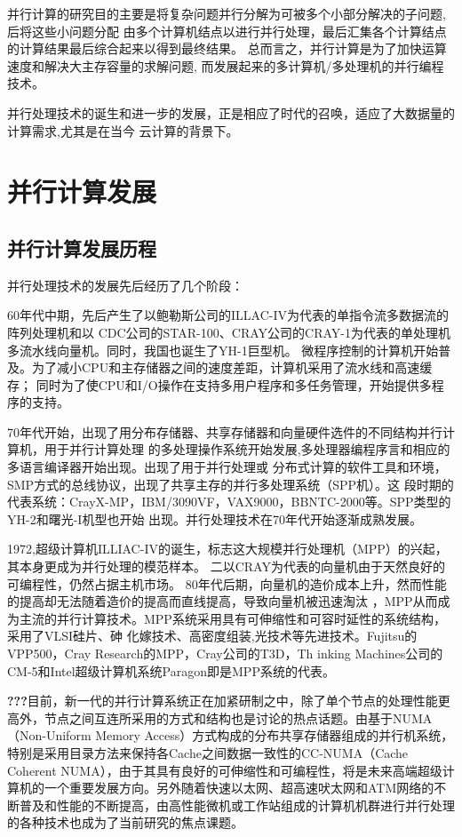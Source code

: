     
并行计算的研究目的主要是将复杂问题并行分解为可被多个小部分解决的子问题,后将这些小问题分配
由多个计算机结点以进行并行处理，最后汇集各个计算结点的计算结果最后综合起来以得到最终结果。
总而言之，并行计算是为了加快运算速度和解决大主存容量的求解问题,
而发展起来的多计算机/多处理机的并行编程技术。

并行处理技术的诞生和进一步的发展，正是相应了时代的召唤，适应了大数据量的计算需求,尤其是在当今
云计算的背景下。

\section{并行计算发展}
\subsection{并行计算发展历程}
并行处理技术的发展先后经历了几个阶段：

60年代中期，先后产生了以鲍勒斯公司的ILLAC-IV为代表的单指令流多数据流的阵列处理机和以
CDC公司的STAR-100、CRAY公司的CRAY-1为代表的单处理机多流水线向量机。同时，我国也诞生了YH-1巨型机。
微程序控制的计算机开始普及。为了减小CPU和主存储器之间的速度差距，计算机采用了流水线和高速缓存；
同时为了使CPU和I/O操作在支持多用户程序和多任务管理，开始提供多程序的支持。

70年代开始，出现了用分布存储器、共享存储器和向量硬件选件的不同结构并行计算机，用于并行计算处理
的多处理操作系统开始发展,多处理器编程序言和相应的多语言编译器开始出现。出现了用于并行处理或
分布式计算的软件工具和环境，SMP方式的总线协议，出现了共享主存的并行多处理系统（SPP机）。这
段时期的代表系统：CrayX-MP，IBM/3090VF，VAX9000，BBNTC-2000等。SPP类型的YH-2和曙光-I机型也开始
出现。并行处理技术在70年代开始逐渐成熟发展。

1972,超级计算机ILLIAC-IV的诞生，标志这大规模并行处理机（MPP）的兴起，其本身更成为并行处理的模范样本。
二以CRAY为代表的向量机由于天然良好的可编程性，仍然占据主机市场。 
80年代后期，向量机的造价成本上升，然而性能的提高却无法随着造价的提高而直线提高，导致向量机被迅速淘汰
，MPP从而成为主流的并行计算技术。MPP系统采用具有可伸缩性和可容时延性的系统结构，采用了VLSI硅片、砷
化嫁技术、高密度组装,光技术等先进技术。Fujitsu的VPP500，Cray Research的MPP，Cray公司的T3D，Th
inking Machines公司的CM-5和Intel超级计算机系统Paragon即是MPP系统的代表。

\textbf{???}目前，新一代的并行计算系统正在加紧研制之中，除了单个节点的处理性能更高外，节点之间互连所采用的方式和结构也是讨论的热点话题。由基于NUMA（Non-Uniform Memory Access）方式构成的分布共享存储器组成的并行机系统，特别是采用目录方法来保持各Cache之间数据一致性的CC-NUMA（Cache Coherent NUMA），由于其具有良好的可伸缩性和可编程性，将是未来高端超级计算机的一个重要发展方向。另外随着快速以太网、超高速吠太网和ATM网络的不断普及和性能的不断提高，由高性能微机或工作站组成的计算机机群进行并行处理的各种技术也成为了当前研究的焦点课题。
